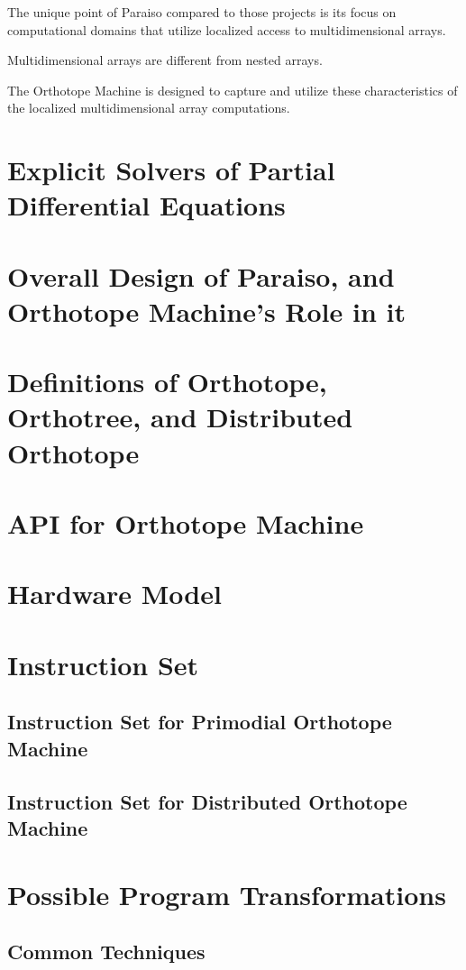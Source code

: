 \documentclass{article}
\begin{document}
The unique point of Paraiso compared to those projects is its focus on
computational domains that utilize localized access to multidimensional
arrays.

Multidimensional arrays are different from nested arrays.

The Orthotope Machine is designed to capture and utilize these
characteristics of the localized multidimensional array computations.

\section{Explicit Solvers of Partial Differential Equations}

\section{Overall Design of Paraiso, and Orthotope Machine's Role in it}


\section{Definitions of Orthotope, Orthotree, and Distributed Orthotope}

\section{API for Orthotope Machine}


\section{Hardware Model}
\section{Instruction Set}
\subsection{Instruction Set for Primodial Orthotope Machine}
\subsection{Instruction Set for Distributed Orthotope Machine}

\section{Possible Program Transformations}
\subsection{Common Techniques}
\end{document}
